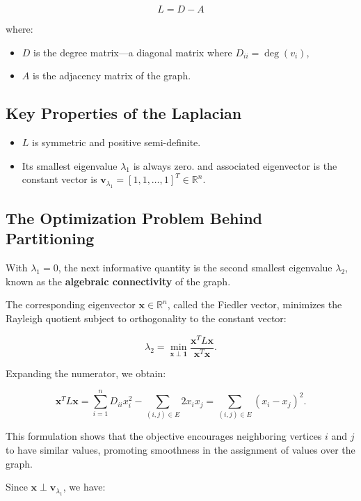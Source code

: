 \documentclass[hidelinks,12pt]{article}
\begin{document}
\[
L = D - A
\]

where:
\begin{itemize}
    \item \( D \) is the degree matrix—a diagonal matrix where \( D_{ii} = \deg(v_i) \),
    \item \( A \) is the adjacency matrix of the graph.
\end{itemize}

\subsection*{Key Properties of the Laplacian}

\begin{itemize}
    \item \( L \) is symmetric and positive semi-definite.
    \item Its smallest eigenvalue \( \lambda_1 \) is always zero. and associated eigenvector is the constant vector is   \(
    \mathbf{v}_{\lambda_1} = [1, 1, \dots, 1]^T \in \mathbb{R}^{n}.
    \)
\end{itemize}

\subsection*{The Optimization Problem Behind Partitioning}

With \( \lambda_1 = 0 \), the next informative quantity is the second smallest eigenvalue \( \lambda_2 \), known as the \textbf{algebraic connectivity} of the graph.

\noindent The corresponding eigenvector \( \mathbf{x} \in \mathbb{R}^n \), called the Fiedler vector, minimizes the Rayleigh quotient subject to orthogonality to the constant vector:

\[
\lambda_2 = \min_{\mathbf{x} \perp \mathbf{1}} \frac{\mathbf{x}^T L \mathbf{x}}{\mathbf{x}^T \mathbf{x}}.
\]

\noindent Expanding the numerator, we obtain:

\[
\mathbf{x}^T L \mathbf{x} = \sum_{i=1}^n D_{ii} x_i^2 - \sum_{(i,j)\in E} 2x_i x_j
= \sum_{(i,j)\in E} (x_i - x_j)^2.
\]

\noindent This formulation shows that the objective encourages neighboring vertices \( i \) and \( j \) to have similar values, promoting smoothness in the assignment of values over the graph.

\noindent Since \( \mathbf{x} \perp \mathbf{v}_{\lambda_1} \), we have:
\end{document}
